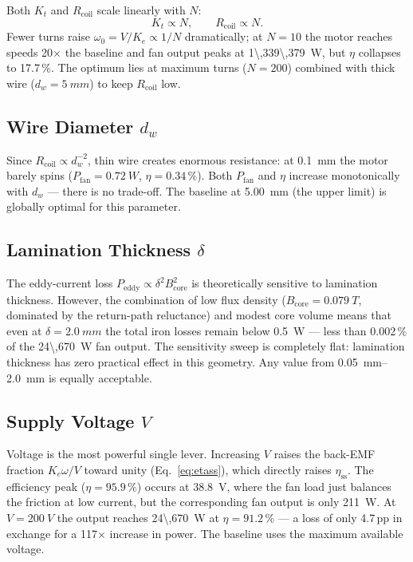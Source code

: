 \documentclass[10pt, twocolumn, a4paper]{article}
\begin{document}
Both $K_t$ and $R_\text{coil}$ scale linearly with $N$:
\begin{equation}
  K_t \propto N, \qquad R_\text{coil} \propto N.
\end{equation}
Fewer turns raise $\omega_0 = V/K_e \propto 1/N$ dramatically; at
$N=10$ the motor reaches speeds 20$\times$ the baseline and fan output
peaks at \SI{1\,339\,379}{W}, but $\eta$ collapses to 17.7\,\%.
The optimum lies at maximum turns ($N=200$) combined with thick wire
($d_w=\SI{5}{mm}$) to keep $R_\text{coil}$ low.

\subsection{Wire Diameter $d_w$}

Since $R_\text{coil} \propto d_w^{-2}$, thin wire creates enormous
resistance: at \SI{0.1}{mm} the motor barely spins ($P_\text{fan} =
\SI{0.72}{W}$, $\eta = 0.34\,\%$).  Both $P_\text{fan}$ and $\eta$
increase monotonically with $d_w$ — there is no trade-off.  The
baseline at \SI{5.00}{mm} (the upper limit) is globally optimal for
this parameter.

\subsection{Lamination Thickness $\delta$}

The eddy-current loss $P_\text{eddy} \propto \delta^2 B_\text{core}^2$
is theoretically sensitive to lamination thickness.  However, the
combination of low flux density ($B_\text{core} = \SI{0.079}{T}$,
dominated by the return-path reluctance) and modest core volume means
that even at $\delta = \SI{2.0}{mm}$ the total iron losses remain
below \SI{0.5}{W} — less than 0.002\,\% of the \SI{24\,670}{W} fan
output.  The sensitivity sweep is completely flat: lamination
thickness has zero practical effect in this geometry.
Any value from \SIrange{0.05}{2.0}{mm} is equally acceptable.

\subsection{Supply Voltage $V$}

Voltage is the most powerful single lever.  Increasing $V$ raises the
back-EMF fraction $K_e\omega/V$ toward unity (Eq.~\ref{eq:etass}),
which directly raises $\eta_\text{ss}$.  The efficiency peak
($\eta = 95.9\,\%$) occurs at \SI{38.8}{V}, where the fan load just
balances the friction at low current, but the corresponding fan output
is only \SI{211}{W}.  At $V=\SI{200}{V}$ the output reaches
\SI{24\,670}{W} at $\eta = 91.2\,\%$ — a loss of only 4.7\,pp in
exchange for a 117$\times$ increase in power.  The baseline uses the
maximum available voltage.
\end{document}
